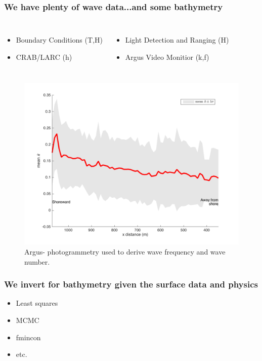 \documentclass[7pt]{beamer}
\begin{document}
\begin{frame}
\frametitle{We have plenty of wave data...and some bathymetry}
\begin{columns}
\begin{itemize}
\item Boundary Conditions (T,H)
\item CRAB/LARC (h)

\end{itemize}
\begin{itemize}
\item Light Detection and Ranging (H)
\item Argus Video Monitior (k,f)
\end{itemize}
\end{columns}

\begin{figure}[H]
\centering
\includegraphics[width=.45\linewidth]{img/k1Dmean_std.png}
\captionsetup{labelformat=empty}
\caption{Argus- photogrammetry used to derive wave frequency and wave number.}

\end{figure}
\end{frame}


\begin{frame}
 \frametitle{We invert for bathymetry given the surface data and physics}

\begin{itemize}
\item Least squares
\item MCMC
\item fmincon
\item etc.
\end{itemize}


\end{frame}
\end{document}
